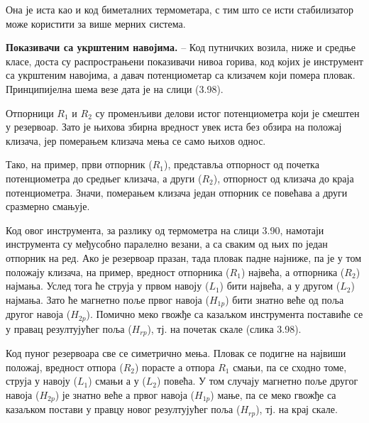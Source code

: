 \documentclass[12pt,a4paper]{report}
\begin{document}

Она је иста као и код биметалних термометара, с тим што се исти стабилизатор може користити за више мерних система.

\textbf{Показивачи са укрштеним навојима.} – Код путничких возила, ниже и средње класе, доста су распрострањени показивачи нивоа горива, код којих је инструмент са укрштеним навојима, а давач потенциометар са клизачем који помера пловак. Принципијелна шема везе дата је на слици (3.98).

Отпорници $R_1$ и $R_2$ су променљиви делови истог потенциометра који је смештен у резервоар. Зато је њихова збирна вредност увек иста без
обзира на положај клизача, јер померањем клизача мења се само њихов однос.


Тако, на пример, први отпорник ($R_1$), представља отпорност од почетка потенциометра до средњег клизача, а други ($R_2$), отпорност од клизача до краја потенциометра. Значи, померањем клизача један отпорник се повећава а други сразмерно смањује.

Код овог инструмента, за разлику од термометра на слици 3.90, намотаји инструмента су међусобно паралелно везани, а са сваким од њих по један отпорник на ред. Ако је резервоар празан, тада пловак падне најниже, па је у том положају клизача, на пример, вредност отпорника ($R_1$) највећа, а отпорника ($R_2$) најмања. Услед тога ће струја у првом навоју ($L_1$) бити највећа, а у другом ($L_2$) најмања. Зато ће магнетно поље првог навоја ($H_{1p}$) бити знатно веће од поља другог навоја ($H_{2p}$). Помично меко гвожђе са казаљком инструмента поставиће се у правац резултујућег поља ($H_{rp}$), тј. на почетак скале (слика 3.98).

Код пуног резервоара све се симетрично мења. Пловак се подигне на највиши положај, вредност отпора ($R_2$) порасте а отпора $R_1$ смањи, па се сходно томе, струја у навоју ($L_1$) смањи а у ($L_2$) повећа. У том случају магнетно поље другог навоја ($H_{2p}$) је знатно веће а првог навоја ($H_{1p}$) мање, па се меко гвожђе са казаљком постави у правцу новог резултујућег поља ($H_{rp}$), тј. на крај скале.
\end{document}
